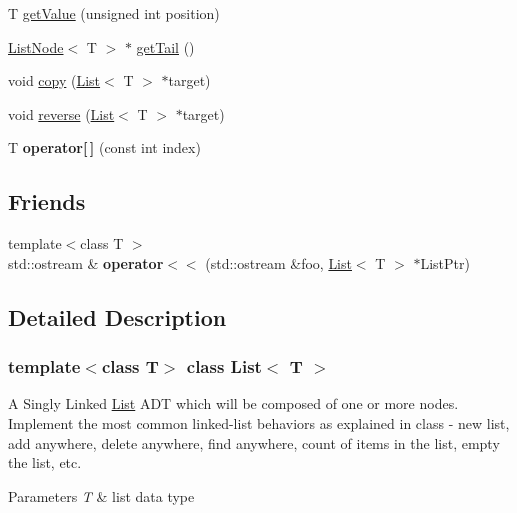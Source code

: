 \begin{DoxyCompactItemize}
\item 
T \hyperlink{class_list_a54d9d5eb688177d16ae8f33a317282a5}{get\+Value} (unsigned int position)
\item 
\hyperlink{class_list_node}{List\+Node}$<$ T $>$ $\ast$ \hyperlink{class_list_a9d222b730d906bcf6fb0834c9c729788}{get\+Tail} ()
\item 
void \hyperlink{class_list_ac6c3b0e253ce3c9b90053b95769f12a9}{copy} (\hyperlink{class_list}{List}$<$ T $>$ $\ast$target)
\item 
void \hyperlink{class_list_ac17012219fedb7d746f5c13501af164e}{reverse} (\hyperlink{class_list}{List}$<$ T $>$ $\ast$target)
\item 
\mbox{\label{class_list_a8133b9df5dcb7941610a4949be986660}} 
T {\bfseries operator\mbox{[}$\,$\mbox{]}} (const int index)
\end{DoxyCompactItemize}
\subsection*{Friends}
\begin{DoxyCompactItemize}
\item 
\mbox{\label{class_list_a79a617fcbf0937a4ef1f1df45558dcc4}} 
{\footnotesize template$<$class T $>$ }\\std\+::ostream \& {\bfseries operator$<$$<$} (std\+::ostream \&foo, \hyperlink{class_list}{List}$<$ T $>$ $\ast$List\+Ptr)
\end{DoxyCompactItemize}


\subsection{Detailed Description}
\subsubsection*{template$<$class T$>$\newline
class List$<$ T $>$}

A Singly Linked \hyperlink{class_list}{List} A\+DT which will be composed of one or more nodes. Implement the most common linked-\/list behaviors as explained in class -\/ new list, add anywhere, delete anywhere, find anywhere, count of items in the list, empty the list, etc. 
\begin{DoxyParams}{Parameters}
{\em T} & list data type \\
\hline
\end{DoxyParams}


